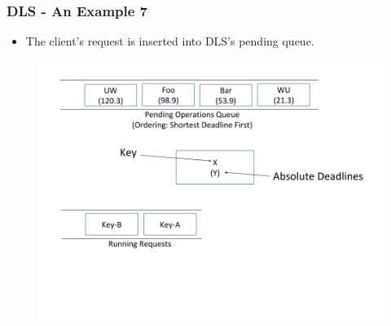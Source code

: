 \documentclass{beamer}
\begin{document}
\begin{frame}
  \frametitle{DLS - An Example 7}
  \begin{itemize}
  \item The client's request is inserted into DLS's pending queue.
\newline
  \end{itemize}
  \begin{figure}
    \begin{center}
      \centerline{\includegraphics[scale=0.38]{img/DLS_Example8.png}}
    \end{center}
  \end{figure}

\end{frame}
\end{document}
